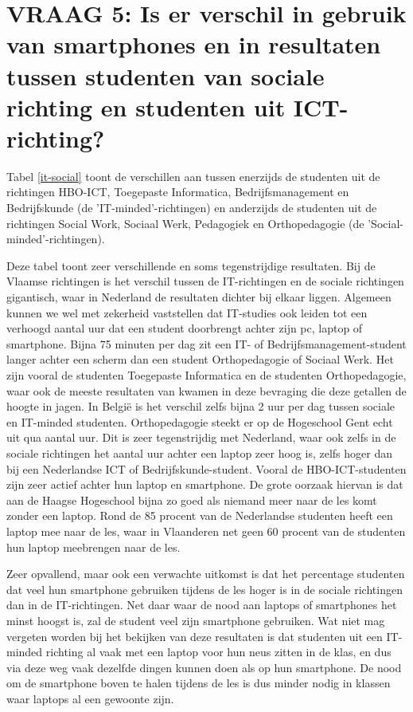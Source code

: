 \section{VRAAG 5: Is er verschil in gebruik van smartphones en in resultaten tussen studenten van sociale richting en studenten uit ICT-richting?}
\label{sec:sociale-it-richting}

Tabel \ref{it-social} toont de verschillen aan tussen enerzijds de studenten uit de richtingen HBO-ICT, Toegepaste Informatica, Bedrijfsmanagement en Bedrijfskunde (de 'IT-minded'-richtingen) en anderzijds de studenten uit de richtingen Social Work, Sociaal Werk, Pedagogiek en Orthopedagogie (de 'Social-minded'-richtingen).

Deze tabel toont zeer verschillende en soms tegenstrijdige resultaten. Bij de Vlaamse richtingen is het verschil tussen de IT-richtingen en de sociale richtingen gigantisch, waar in Nederland de resultaten dichter bij elkaar liggen. Algemeen kunnen we wel met zekerheid vaststellen dat IT-studies ook leiden tot een verhoogd aantal uur dat een student doorbrengt achter zijn pc, laptop of smartphone. Bijna 75 minuten per dag zit een IT- of Bedrijfsmanagement-student langer achter een scherm dan een student Orthopedagogie of Sociaal Werk. Het zijn vooral de studenten Toegepaste Informatica en de studenten Orthopedagogie, waar ook de meeste resultaten van kwamen in deze bevraging die deze getallen de hoogte in jagen. In België is het verschil zelfs bijna 2 uur per dag tussen sociale en IT-minded studenten. Orthopedagogie steekt er op de Hogeschool Gent echt uit qua aantal uur. Dit is zeer tegenstrijdig met Nederland, waar ook zelfs in de sociale richtingen het aantal uur achter een laptop zeer hoog is, zelfs hoger dan bij een Nederlandse ICT of Bedrijfskunde-student. Vooral de HBO-ICT-studenten zijn zeer actief achter hun laptop en smartphone. De grote oorzaak hiervan is dat aan de Haagse Hogeschool bijna zo goed als niemand meer naar de les komt zonder een laptop. Rond de 85 procent van de Nederlandse studenten heeft een laptop mee naar de les, waar in Vlaanderen net geen 60 procent van de studenten hun laptop meebrengen naar de les.

Zeer opvallend, maar ook een verwachte uitkomst is dat het percentage studenten dat veel hun smartphone gebruiken tijdens de les hoger is in de sociale richtingen dan in de IT-richtingen. Net daar waar de nood aan laptops of smartphones het minst hoogst is, zal de student veel zijn smartphone gebruiken. Wat niet mag vergeten worden bij het bekijken van deze resultaten is dat studenten uit een IT-minded richting al vaak met een laptop voor hun neus zitten in de klas, en dus via deze weg vaak dezelfde dingen kunnen doen als op hun smartphone. De nood om de smartphone boven te halen tijdens de les is dus minder nodig in klassen waar laptops al een gewoonte zijn.

